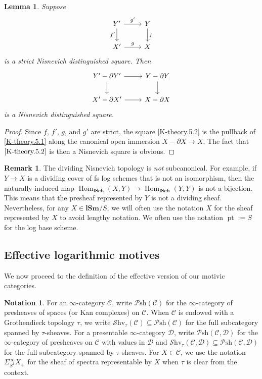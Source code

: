 \documentclass[11pt, a4paper]{amsart}
\newtheorem{lem}[thm]{Lemma}
\theoremstyle{definition}
\newtheorem{rmk}[thm]{Remark}
\newtheorem{notat}[thm]{Notation}
\numberwithin{equation}{subsection}
\newcommand{\lSch}{\mathbf{lSch}}
\newcommand{\lSm}{\mathbf{lSm}}
\renewcommand{\hom}{\operatorname{Hom}}				 %
\newcommand{\pt}[1]{\mathrm{\pt}_{#1}}
\newcommand{\cD}{\mathcal{D}}
\def\pt{\operatorname{pt}}
\newcommand{\infPsh}{\mathcal{P}\mathrm{sh}}
\newcommand{\infShv}{\mathcal{S}\mathrm{hv}}
\newcommand{\infC}{\mathcal{C}}
\newcommand{\infD}{\mathcal{D}}
\begin{document}
\begin{lem}
\label{K-theory.5}
Suppose
\begin{equation}
\label{K-theory.5.1}
\begin{tikzcd}
Y'\arrow[d,"f'"']\arrow[r,"g'"]&
Y\arrow[d,"f"]
\\
X'\arrow[r,"g"]&
X
\end{tikzcd}
\end{equation}
is a strict Nisnevich distinguished square.
Then
\begin{equation}
\label{K-theory.5.2}
\begin{tikzcd}
Y'-\partial Y'\arrow[d]\arrow[r]&
Y-\partial Y\arrow[d]
\\
X'-\partial X'\arrow[r]&
X-\partial X
\end{tikzcd}
\end{equation}
is a Nisnevich distinguished square.
\end{lem}
\begin{proof}
Since $f$, $f'$, $g$, and $g'$ are strict, 
the square \eqref{K-theory.5.2} is the pullback of \eqref{K-theory.5.1} along the canonical open immersion 
$X-\partial X\to X$. The fact that $\eqref{K-theory.5.2}$ is then a Nisnevich square is obvious.
\end{proof}

\begin{rmk}
The dividing Nisnevich topology is \emph{not} subcanonical.
For example,
if $Y\to X$ is a dividing cover of fs log schemes that is not an isomorphism,
then the naturally induced map $\hom_{\lSch}(X,Y)\to \hom_{\lSch}(Y,Y)$ is not a bijection.
This means that the presheaf represented by $Y$ is not a dividing sheaf.
Nevertheless, 
for any $X\in \lSm/S$, 
we will often use the notation $X$ for the sheaf represented by $X$ to avoid lengthy notation.
We often use the notation $\pt:=S$ for the log base scheme.
\end{rmk}
 


\subsection{Effective logarithmic motives}
\label{alter}
 We now proceed to the definition of the effective version of our motivic categories. 






\begin{notat}
For an $\infty$-category $\infC$, write $\infPsh(\infC)$ for the $\infty$-category of presheaves of spaces (or Kan complexes) on $\infC$. When $\infC$ is endowed with a Grothendieck topology $\tau$, we write $\infShv_\tau(\infC) \subseteq \infPsh(\infC)$ for the full subcategory spanned by $\tau$-sheaves.
For a presentable $\infty$-category $\infD$,
write $\infPsh(\infC,\infD)$ for the $\infty$-category of presheaves on $\infC$ with values in $\cD$ and $\infShv_\tau(\infC,\infD)\subseteq \infPsh(\infC,\infD)$ for the full subcategory spanned by $\tau$-sheaves.
For $X\in \infC$,
we use the notation $\Sigma_{S^1}^\infty X_+$ for the sheaf of spectra representable by $X$ when $\tau$ is clear from the context.
\end{notat}
\end{document}
